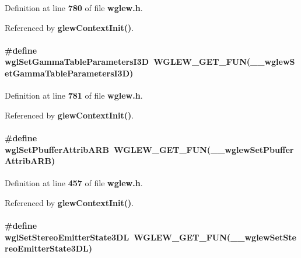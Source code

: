 Definition at line {\bf 780} of file {\bf wglew.\+h}.



Referenced by {\bf glew\+Context\+Init()}.

\paragraph[{wgl\+Set\+Gamma\+Table\+Parameters\+I3D}]{\setlength{\rightskip}{0pt plus 5cm}\#define wgl\+Set\+Gamma\+Table\+Parameters\+I3D~{\bf W\+G\+L\+E\+W\+\_\+\+G\+E\+T\+\_\+\+F\+UN}({\bf \+\_\+\+\_\+wglew\+Set\+Gamma\+Table\+Parameters\+I3D})}\label{wglew_8h_aecb3d556088235fa9bc8a2f73bf49e8a}


Definition at line {\bf 781} of file {\bf wglew.\+h}.



Referenced by {\bf glew\+Context\+Init()}.

\paragraph[{wgl\+Set\+Pbuffer\+Attrib\+A\+RB}]{\setlength{\rightskip}{0pt plus 5cm}\#define wgl\+Set\+Pbuffer\+Attrib\+A\+RB~{\bf W\+G\+L\+E\+W\+\_\+\+G\+E\+T\+\_\+\+F\+UN}({\bf \+\_\+\+\_\+wglew\+Set\+Pbuffer\+Attrib\+A\+RB})}\label{wglew_8h_a4a079e1851a0b8be744f24ca601352c9}


Definition at line {\bf 457} of file {\bf wglew.\+h}.



Referenced by {\bf glew\+Context\+Init()}.

\paragraph[{wgl\+Set\+Stereo\+Emitter\+State3\+DL}]{\setlength{\rightskip}{0pt plus 5cm}\#define wgl\+Set\+Stereo\+Emitter\+State3\+DL~{\bf W\+G\+L\+E\+W\+\_\+\+G\+E\+T\+\_\+\+F\+UN}({\bf \+\_\+\+\_\+wglew\+Set\+Stereo\+Emitter\+State3\+DL})}\label{wglew_8h_a2fbb5d5b06a123ca0e84fe88765c01ef}



